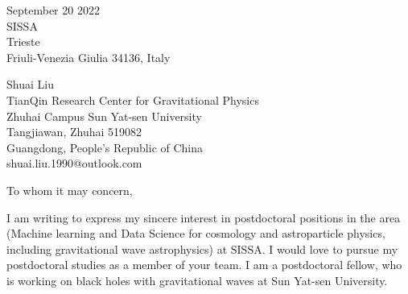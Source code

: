 \documentclass[11pt,a4paper,sans]{letter} %
\date{}
\begin{document}

\begin{letter}{September 20 2022 \\
SISSA\\
Trieste\\ 
Friuli-Venezia Giulia 34136, Italy}

Shuai Liu \\
TianQin Research Center for Gravitational Physics \\
Zhuhai Campus Sun Yat-sen University \\
Tangjiawan, Zhuhai 519082 \\
Guangdong, People's Republic of China \\
shuai.liu.1990@outlook.com








\opening{To whom it may concern,} 
 
    I am writing to express my sincere interest in postdoctoral positions in the area (Machine learning and Data Science
    for cosmology and astroparticle physics, including gravitational wave astrophysics) at SISSA. I would love to
pursue my postdoctoral studies as a member of your team. I am a postdoctoral fellow, who is working on black holes with
    gravitational waves at Sun Yat-sen University.


\end{letter}
\end{document}
